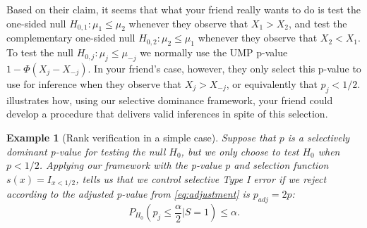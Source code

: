 \documentclass{article}
\newtheorem{example}{Example}
\begin{document}
Based on their claim, it seems that what your friend really wants to do is test the one-sided null $H_{0, 1} : \mu_1 \leq \mu_2$ whenever they observe that $X_1 > X_2$, and test the complementary one-sided null $H_{0, 2} : \mu_2 \leq \mu_1$ whenever they observe that $X_2 < X_1$. To test the null $H_{0, j} : \mu_{j} \leq \mu_{-j}$ we normally use the UMP p-value  $1 - \Phi(X_j - X_{-j})$. In your friend's case, however, they only select this p-value to use for inference when they observe that $X_j > X_{-j}$, or equivalently that $p_j < 1/2$.  illustrates how, using our selective dominance framework, your friend could develop a procedure that delivers valid inferences in spite of this selection.  

\begin{example}[Rank verification in a simple case]
\label{exm:rank_verification}
Suppose that $p$ is a selectively dominant p-value for testing the null $H_0$, but we only choose to test $H_0$ when $p < 1/2$. Applying our framework with the p-value $p$ and selection function $s(x) = I_{x < 1/2}$,  tells us that we control selective Type I error if we reject according to the adjusted p-value from \eqref{eq:adjustment} is $p_{adj} = 2p$:
\begin{equation}
    \label{eq:rank_verification_error_control}
    P_{H_{0}}\left(p_j \leq \frac{\alpha}{2} | S = 1\right) \leq \alpha.
\end{equation} 


\end{example}
\end{document}
